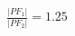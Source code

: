 \documentclass[preview]{standalone}
\begin{document}
\begin{align*}
\frac{|PF_1|}{|PF_2|} = 1.25
\end{align*}
\end{document}
